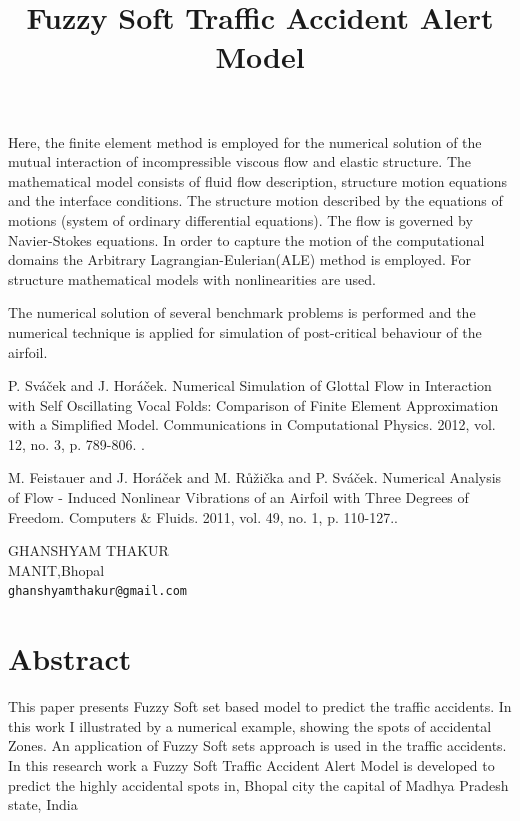 \documentclass[article,A4,11pt]{llncs}%
\begin{document}
Here, the  finite element method is  employed for the numerical solution of the mutual interaction of incompressible viscous flow and elastic structure.
The mathematical model consists of fluid flow description, structure motion
equations and the interface conditions.
The structure motion described by the equations of motions (system of ordinary differential equations). The flow is governed by Navier-Stokes  equations.
In order to capture the motion of the computational domains the Arbitrary Lagrangian-Eulerian(ALE) method is employed.
For structure mathematical models with nonlinearities are used. 

The numerical solution of several benchmark problems is performed and the numerical technique is applied for simulation 
of post-critical behaviour of the airfoil.



\begin{thebibliography}{10}
{\sc P. Sváček and J. Horáček}. {Numerical Simulation of Glottal Flow in Interaction with Self Oscillating Vocal Folds: Comparison of Finite Element Approximation with a Simplified Model}. Communications in Computational Physics. 2012, vol. 12, no. 3, p. 789-806. .

{\sc M. Feistauer and J. Horáček and M. Růžička and P. Sváček}. {Numerical Analysis of Flow - Induced Nonlinear Vibrations of an Airfoil with Three Degrees of Freedom}. Computers \& Fluids. 2011, vol. 49, no. 1, p. 110-127..
\end{thebibliography}

\title{Fuzzy Soft Traffic Accident Alert Model}
 \author{} \institute{}
\maketitle
\begin{center}
{\large GHANSHYAM THAKUR}\\
MANIT,Bhopal\\
{\tt ghanshyamthakur@gmail.com}
\end{center}

\section*{Abstract}
This paper presents Fuzzy Soft set based model to predict the traffic accidents. In this work I illustrated by a numerical example, showing the spots of accidental Zones. An application of Fuzzy Soft sets approach is used in the traffic accidents. In this research work a Fuzzy Soft Traffic Accident Alert Model is developed to predict the highly accidental spots in, Bhopal city the capital of Madhya Pradesh state, India
\end{document}
